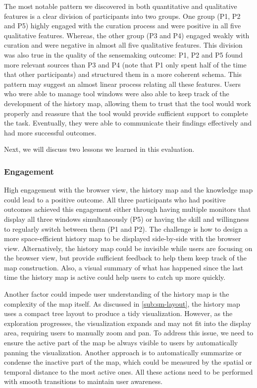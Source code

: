 The most notable pattern we discovered in both quantitative and qualitative features is a clear division of participants into two groups. One group (P1, P2 and P5) highly engaged with the  curation process and were positive in all five qualitative features. Whereas, the other group (P3 and P4) engaged weakly with curation and were negative in almost all five qualitative features. This division was also true in the quality of the sensemaking outcome: P1, P2 and P5 found more relevant sources than P3 and P4 (note that P1 only spent half of the time that other participants) and structured them in a more coherent schema. This pattern may suggest an almost linear process relating all these features. Users who were able to manage tool windows were also able to keep track of the development of the history map, allowing them to trust that the tool would work properly and reassure that the tool would provide sufficient support to complete the task. Eventually, they were able to communicate their findings effectively and had more successful outcomes.

Next, we will discuss two lessons we learned in this evaluation.

\subsubsection{Engagement}
High engagement with the browser view, the history map and the knowledge map could lead to a positive outcome. All three participants who had positive outcomes achieved this engagement either through having multiple monitors that display all three windows simultaneously (P5) or having the skill and willingness to regularly switch between them (P1 and P2). The challenge is how to design a more space-efficient history map to be displayed side-by-side with the browser view.  Alternatively, the history map could be invisible while users are focusing on the browser view, but provide sufficient feedback to help them keep track of the map construction. Also, a visual summary of what has happened since the last time the history map is active could help users to catch up more quickly.

Another factor could impede user understanding of the history map is the complexity of the map itself.  As discussed in \autoref{sub:sm-layout}, the history map uses a compact tree layout to produce a tidy visualization. However, as the exploration progresses, the visualization expands and may not fit into the display area, requiring users to manually zoom and pan. To address this issue, we need to ensure the active part of the map be always visible to users by automatically panning the visualization. Another approach is to automatically summarize or condense the inactive part of the map, which could be measured by the spatial or temporal distance to the most active ones. All these actions need to be performed with smooth transitions to maintain user awareness.

